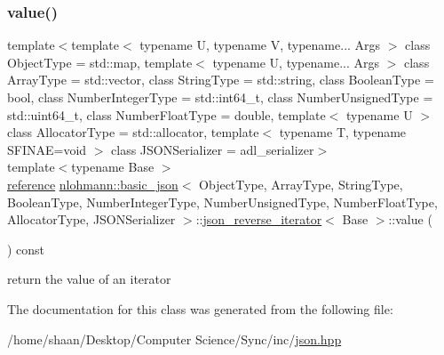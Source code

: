 \subsubsection{\texorpdfstring{value()}{value()}}
{\footnotesize\ttfamily template$<$template$<$ typename U, typename V, typename... Args $>$ class Object\+Type = std\+::map, template$<$ typename U, typename... Args $>$ class Array\+Type = std\+::vector, class String\+Type  = std\+::string, class Boolean\+Type  = bool, class Number\+Integer\+Type  = std\+::int64\+\_\+t, class Number\+Unsigned\+Type  = std\+::uint64\+\_\+t, class Number\+Float\+Type  = double, template$<$ typename U $>$ class Allocator\+Type = std\+::allocator, template$<$ typename T, typename S\+F\+I\+N\+A\+E=void $>$ class J\+S\+O\+N\+Serializer = adl\+\_\+serializer$>$ \\
template$<$typename Base $>$ \\
\hyperlink{classnlohmann_1_1basic__json_1_1json__reverse__iterator_ab0021ef2007fd338615360af404dcd4e}{reference} \hyperlink{classnlohmann_1_1basic__json}{nlohmann\+::basic\+\_\+json}$<$ Object\+Type, Array\+Type, String\+Type, Boolean\+Type, Number\+Integer\+Type, Number\+Unsigned\+Type, Number\+Float\+Type, Allocator\+Type, J\+S\+O\+N\+Serializer $>$\+::\hyperlink{classnlohmann_1_1basic__json_1_1json__reverse__iterator}{json\+\_\+reverse\+\_\+iterator}$<$ Base $>$\+::value (\begin{DoxyParamCaption}{ }\end{DoxyParamCaption}) const\hspace{0.3cm}{\ttfamily [inline]}}



return the value of an iterator 



The documentation for this class was generated from the following file\+:\begin{DoxyCompactItemize}
\item 
/home/shaan/\+Desktop/\+Computer Science/\+Sync/inc/\hyperlink{json_8hpp}{json.\+hpp}\end{DoxyCompactItemize}

